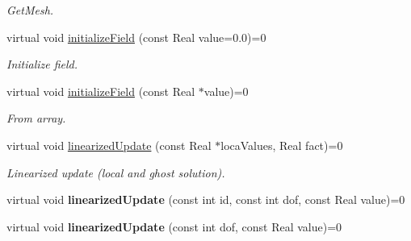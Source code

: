 \begin{DoxyCompactItemize}
\begin{DoxyCompactList}\small\item\em GetMesh. \item\end{DoxyCompactList}\item 
\hypertarget{classvoom_1_1_model_a96733c4f27d698641cae7ff7370d8738}{
virtual void \hyperlink{classvoom_1_1_model_a96733c4f27d698641cae7ff7370d8738}{initializeField} (const Real value=0.0)=0}
\label{classvoom_1_1_model_a96733c4f27d698641cae7ff7370d8738}

\begin{DoxyCompactList}\small\item\em Initialize field. \item\end{DoxyCompactList}\item 
\hypertarget{classvoom_1_1_model_a905c745b8c5881503c1142722df7f128}{
virtual void \hyperlink{classvoom_1_1_model_a905c745b8c5881503c1142722df7f128}{initializeField} (const Real $\ast$value)=0}
\label{classvoom_1_1_model_a905c745b8c5881503c1142722df7f128}

\begin{DoxyCompactList}\small\item\em From array. \item\end{DoxyCompactList}\item 
\hypertarget{classvoom_1_1_model_abd698819968dbbf1b7fc1961d7eb3bad}{
virtual void \hyperlink{classvoom_1_1_model_abd698819968dbbf1b7fc1961d7eb3bad}{linearizedUpdate} (const Real $\ast$locaValues, Real fact)=0}
\label{classvoom_1_1_model_abd698819968dbbf1b7fc1961d7eb3bad}

\begin{DoxyCompactList}\small\item\em Linearized update (local and ghost solution). \item\end{DoxyCompactList}\item 
\hypertarget{classvoom_1_1_model_a46e1f26bb972bdbaf015dbb4dd58b5d1}{
virtual void {\bfseries linearizedUpdate} (const int id, const int dof, const Real value)=0}
\label{classvoom_1_1_model_a46e1f26bb972bdbaf015dbb4dd58b5d1}

\item 
\hypertarget{classvoom_1_1_model_aed6697e5199d4979672ffe0712c3de90}{
virtual void {\bfseries linearizedUpdate} (const int dof, const Real value)=0}
\label{classvoom_1_1_model_aed6697e5199d4979672ffe0712c3de90}


\end{DoxyCompactItemize}
